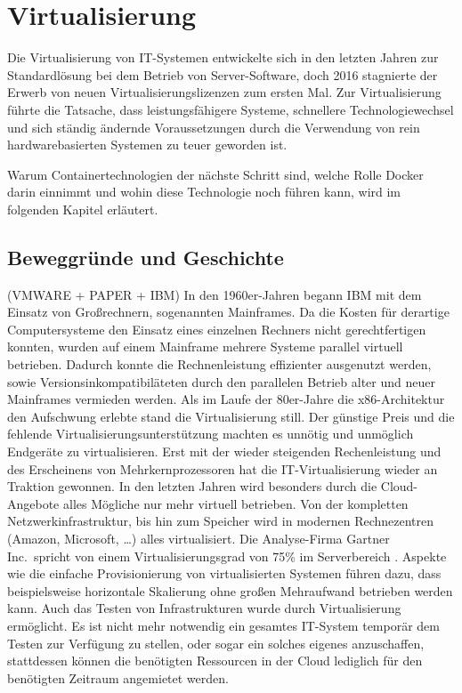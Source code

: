 \chapter{Virtualisierung}
\label{cha:virtualisierung}
Die Virtualisierung von IT-Systemen entwickelte sich in den letzten Jahren zur Standardlösung bei dem Betrieb von Server-Software, doch 2016 stagnierte der Erwerb von neuen Virtualisierungslizenzen zum ersten Mal. \autocite{Gartner-Magic-Quadrant2016:online}
Zur Virtualisierung führte die Tatsache, dass leistungsfähigere Systeme, schnellere Technologiewechsel und sich ständig ändernde Voraussetzungen durch die Verwendung von rein hardwarebasierten Systemen zu teuer geworden ist.~\autocite{vmware-virtualization-history:online}

Warum Containertechnologien der nächste Schritt sind, welche Rolle Docker darin einnimmt und wohin diese Technologie noch führen kann, wird im folgenden Kapitel erläutert.
\section{Beweggründe und Geschichte}
\label{sec:virtualisierungsgeschichte}
(VMWARE + PAPER + IBM) In den 1960er-Jahren begann IBM mit dem Einsatz von Großrechnern, sogenannten Mainframes.
Da die Kosten für derartige Computersysteme den Einsatz eines einzelnen Rechners nicht gerechtfertigen konnten, wurden auf einem Mainframe mehrere Systeme parallel virtuell betrieben.
Dadurch konnte die Rechnenleistung effizienter ausgenutzt werden, sowie Versionsinkompatibiläteten durch den parallelen Betrieb alter und neuer Mainframes vermieden werden.
Als im Laufe der 80er-Jahre die x86-Architektur den Aufschwung erlebte stand die Virtualisierung still.
Der günstige Preis und die fehlende Virtualisierungsunterstützung machten es unnötig und unmöglich Endgeräte zu virtualisieren.
Erst mit der wieder steigenden Rechenleistung und des Erscheinens von Mehrkernprozessoren hat die IT-Virtualisierung wieder an Traktion gewonnen.
In den letzten Jahren wird besonders durch die Cloud-Angebote alles Mögliche nur mehr virtuell betrieben.
Von der  kompletten Netzwerkinfrastruktur, bis hin zum Speicher wird in modernen Rechnezentren (Amazon, Microsoft, \dots) alles virtualisiert.
Die Analyse-Firma Gartner Inc.\ spricht von einem Virtualisierungsgrad von 75\% im Serverbereich \autocite{Gartner-Server-Virtualization:online}.
Aspekte wie die einfache Provisionierung von virtualisierten Systemen führen dazu, dass beispielsweise horizontale Skalierung ohne großen Mehraufwand betrieben werden kann.
Auch das Testen von Infrastrukturen wurde durch Virtualisierung ermöglicht.
Es ist nicht mehr notwendig ein gesamtes IT-System temporär dem Testen zur Verfügung zu stellen, oder sogar ein solches eigenes anzuschaffen, stattdessen können die benötigten Ressourcen in der Cloud lediglich für den benötigten Zeitraum angemietet werden.
